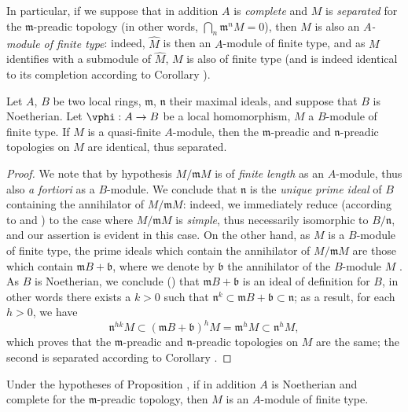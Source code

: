 In particular, if we suppose that in addition $A$ is \emph{complete} and $M$ is
\emph{separated} for the $\mathfrak{m}$-preadic topology (in other words,
$\bigcap_n\mathfrak{m}^n M=0$), then $M$ is also an \emph{$A$-module of finite type}: indeed,
$\widehat{M}$ is then an $A$-module of finite type, and as $M$ identifies with a submodule of
$\widehat{M}$, $M$ is also of finite type (and is indeed identical to its completion
according to Corollary ).

\begin{proposition}[7.4.2]
\label{0.7.4.2}
Let $A$, $B$ be two local rings, $\mathfrak{m}$, $\mathfrak{n}$ their maximal ideals, and
suppose that $B$ is Noetherian. Let $\vphi:A\to B$ be a local homomorphism, $M$ a $B$-module
of finite type. If $M$ is a quasi-finite $A$-module, then the $\mathfrak{m}$-preadic and
$\mathfrak{n}$-preadic topologies on $M$ are identical, thus separated.
\end{proposition}

\begin{proof}
We note that by hypothesis $M/\mathfrak{m}M$ is of \emph{finite length} as an $A$-module,
thus also \emph{a fortiori} as a $B$-module. We conclude that $\mathfrak{n}$ is the
\emph{unique prime ideal} of $B$ containing the annihilator of $M/\mathfrak{m}M$: indeed, we
immediately reduce (according to  and
) to the case where $M/\mathfrak{m}M$ is \emph{simple}, thus
necessarily isomorphic to $B/\mathfrak{n}$, and our assertion is evident in this case. On
the other hand, as $M$ is a $B$-module of finite type, the prime ideals which contain the
annihilator of $M/\mathfrak{m}M$ are those which contain $\mathfrak{m}B+\mathfrak{b}$, where
we denote by $\mathfrak{b}$ the annihilator of the $B$-module $M$
. As $B$ is Noetherian, we conclude
(\cite[p.~127, Cor.~4]{I-11}) that $\mathfrak{m}B+\mathfrak{b}$ is an ideal
of definition for $B$, in other words there exists a $k>0$ such that
$\mathfrak{n}^k\subset\mathfrak{m}B+\mathfrak{b}\subset\mathfrak{n}$; as a result, for each
$h>0$, we have
\[
  \mathfrak{n}^{hk}M\subset(\mathfrak{m}B+\mathfrak{b})^h M
  =\mathfrak{m}^h M\subset\mathfrak{n}^h M,
\]
which proves that the $\mathfrak{m}$-preadic and $\mathfrak{n}$-preadic topologies on $M$
are the same; the second is separated according to Corollary .
\end{proof}

\begin{corollary}[7.4.3]
\label{0.7.4.3}
Under the hypotheses of Proposition , if in addition $A$ is
Noetherian and complete for the $\mathfrak{m}$-preadic topology, then $M$ is an $A$-module
of finite type.
\end{corollary}

